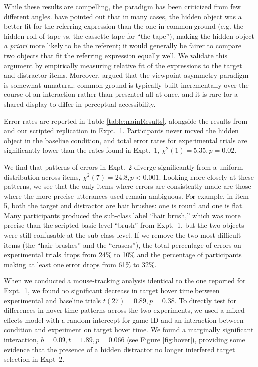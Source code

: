 \documentclass[manuscript]{stjour}
\begin{document}
While these results are compelling, the paradigm has been criticized from few different angles. 
\cite{HellerGrodnerTanenhaus08_Perspective} have pointed out that in many cases, the hidden object was a better fit for the referring expression than the one in common ground (e.g. the hidden roll of tape vs. the cassette tape for ``the tape''), making the hidden object \emph{a priori} more likely to be the referent; it would generally be fairer to compare two objects that fit the referring expression equally well. 
We validate this argument by empirically measuring relative fit of the expressions to the target and distractor items.
Moreover, \cite{HannaTanenhausTrueswell03_CommonGroundPerspective, HannaTanenhaus04_PragmaticEffects} argued that the viewpoint asymmetry paradigm is somewhat unnatural: common ground is typically built incrementally over the course of an interaction rather than presented all at once, and it is rare for a shared display to differ in perceptual accessibility. 

Error rates are reported in Table \ref{table:mainResults}, alongside the results from \cite{KeysarLinBarr03_LimitsOnTheoryOfMindUse} and our scripted replication in Expt.~1. Participants never moved the hidden object in the baseline condition, and total error rates for experimental trials are significantly lower than the rates found in Expt.~1, $\chi^2(1) = 5.35, p = 0.02$.

We find that patterns of errors in Expt.~2 diverge significantly from a uniform distribution across items, $\chi^2(7) = 24.8, p < 0.001$. Looking more closely at these patterns, we see that the only items where errors are consistently made are those where the more precise utterances used remain ambiguous. For example, in item 5, both the target and distractor are hair brushes: one is round and one is flat. Many participants produced the sub-class label ``hair brush,'' which was more precise than the scripted basic-level ``brush'' from Expt.~1, but the two objects were still confusable at the sub-class level. If we remove the two most difficult items (the ``hair brushes'' and the ``erasers''), the total percentage of errors on experimental trials drops from 24\% to 10\% and the percentage of participants making at least one error drops from 61\% to 32\%.

When we conducted a mouse-tracking analysis identical to the one reported for Expt.~1, we found no significant decrease in target hover time between experimental and baseline trials $t(27) = 0.89, p = 0.38$. To directly test for differences in hover time patterns across the two experiments, we used a mixed-effects model with a random intercept for game ID and an interaction between condition and experiment on target hover time. We found a marginally significant interaction, $b = 0.09, t = 1.89, p = 0.066$ (see Figure \ref{fig:hover}), providing some evidence that the presence of a hidden distractor no longer interfered target selection in Expt~2.
\end{document}
